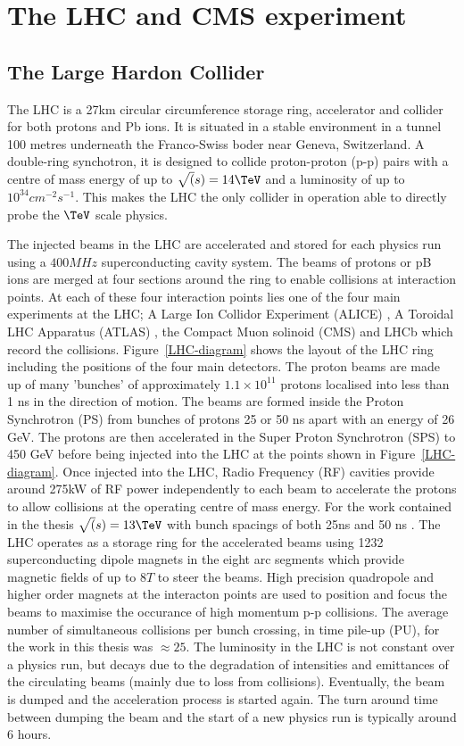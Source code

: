 
\chapter{The LHC and CMS experiment} %
\section{The Large Hardon Collider}
The LHC is a 27km circular circumference storage ring, accelerator and collider for 
both protons and Pb ions. It is situated in a stable environment in a tunnel 
100 metres underneath the Franco-Swiss boder near Geneva, Switzerland.
A double-ring synchotron, it is designed to collide proton-proton (p-p)
pairs with a centre of mass energy of up to $\sqrt(s)=14\TeV$ and a 
luminosity of up to $10^{34}cm^{-2}s^{-1}$. This makes the LHC the only collider
in operation able to directly probe the $\TeV$ scale physics. 

The injected beams in the LHC are accelerated and stored for each physics run using 
a $400MHz$ superconducting cavity system. The beams of protons or pB ions 
are merged at four sections around the ring to enable collisions at interaction points.
At each of these four interaction points lies one of the four main 
experiments at the LHC; A Large Ion Collidor Experiment (ALICE) \cite{ALICE},
A Toroidal LHC Apparatus (ATLAS) \cite{ATLAS}, the Compact Muon solinoid (CMS) \cite{CMS}
and LHCb which record the collisions. Figure~\ref{LHC-diagram} shows the layout of the LHC ring including
the positions of the four main detectors. The proton beams are made up of many 'bunches' of approximately $1.1\times10^{11}$
protons localised into less than 1 ns in the direction of motion.
The beams are formed inside the Proton Synchrotron (PS) from bunches of protons 25 or 50 ns apart with an energy of 26 GeV. 
The protons are then accelerated in the Super Proton Synchrotron (SPS) to 450 GeV before being injected into the LHC at
the points shown in Figure~\ref{LHC-diagram}. Once injected into the LHC, Radio Frequency (RF) cavities 
provide around 275kW of RF power independently to each beam to accelerate the protons to allow collisions
at the operating centre of mass energy. For the work contained in the thesis $\sqrt(s) = 13\TeV$ with bunch spacings of both
25ns and 50 ns \cite{LHC}. The LHC operates as a storage ring for the accelerated beams using 1232 
superconducting dipole magnets in the eight arc segments which provide magnetic fields of up to $8T$ to steer the beams. 
High precision quadropole and higher order magnets at the interacton points are used to position and focus the beams to 
maximise the occurance of high momentum p-p collisions. The average number of simultaneous collisions
per bunch crossing, in time pile-up (PU), for the work in this thesis was $\approx25$.
The luminosity in the LHC is not constant over a physics run, but decays due to the degradation 
of intensities and emittances of the circulating beams (mainly due to loss from collisions). Eventually,
the beam is dumped and the acceleration process is started again. The turn around time between dumping
the beam and the start of a new physics run is typically around 6 hours.

